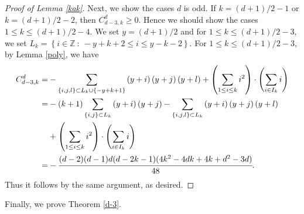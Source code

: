 \documentclass[12pt]{amsart}
\theoremstyle{definition}
\theoremstyle{remark}
\numberwithin{equation}{section}
\def\NZQ{\mathbb}               %
\def\ZZ{{\NZQ Z}}
\begin{document}
\begin{proof}[Proof of Lemma \ref{kak}]
	Next, we show the cases $d$ is odd.
	If $k= (d+1)/2 -1$ or $k=(d+1)/2 -2$, then $C_{d-3,k}^d\geq0$.
	Hence we should show the cases $1 \leq k \leq (d+1)/2-4$.
	We set $y=(d+1)/2$ and for $1 \leq k \leq (d+1)/2-3$,
	we set $L_k=\left\{i \in \ZZ \ : \  -y+k+2\leq i \leq y-k-2 \right\}.$
	For $1 \leq k \leq (d+1)/2-3$, by Lemma \ref{poly}, we have
	\begin{displaymath}
	\begin{aligned}
C_{d-3,k}^d
	=&-\sum\limits_{\left\{i,j,l\right\}\subset L_k \cup \left\{-y+k+1\right\}}\left(y+i\right)\left(y+j\right)\left(y+l\right)+\left(\sum\limits_{1 \leq i \leq k}i^2\right)\cdot\left(\sum\limits_{i\in I_k}i\right)\\
    =&-(k+1)\sum\limits_{\left\{i,j\right\}\subset L_k}\left(y+i\right)\left(y+j\right)-\sum\limits_{\left\{i,j,l\right\}\subset L_k}\left(y+i\right)\left(y+j\right)\left(y+l\right)\\
    &+\left(\sum\limits_{1 \leq i \leq k}i^2\right)\cdot\left(\sum\limits_{i\in I_k}i\right)\\
	=&-\cfrac{(d-2)(d-1)d(d-2k-1)(4k^2-4dk+4k+d^2-3d)}{48}.
	\end{aligned} 
	\end{displaymath}
    Thus it follows by the same argument, as desired.
\end{proof}
Finally, we prove Theorem \ref{d-3}.
\end{document}
